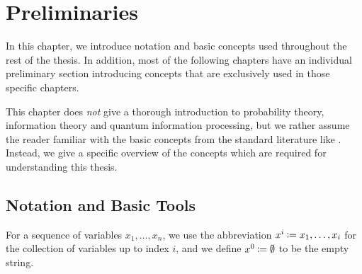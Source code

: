 \documentclass[final,11pt,a4paper]{report}
\newcommand*{\mycitation}[2]{
  {\begin{flushright}
      \emph{#1} \\ 
      \textrm{--- #2}
    \end{flushright}}}
\newcommand*{\clearemptydoublepage}{\newpage{\pagestyle{empty}\cleardoublepage}}
\newcommand*{\assign}{\ensuremath{\kern.5ex\raisebox{.1ex}{\mbox{\rm:}}\kern -.3em =}}
\newcommand*{\prei}[2][i-1]{#2^{#1}} %
\begin{document}
\pagestyle{empty} 
\setcounter{secnumdepth}{-1}






\clearemptydoublepage
{}
{}
\tableofcontents
\clearemptydoublepage
{}
\setcounter{secnumdepth}{2}

\pagestyle{myheadings}
\renewcommand*{\chaptermark}[1]{\markboth{\textsc{\chaptername\
      \thechapter. #1}}{}} 
\renewcommand*{\sectionmark}[1]{\markright{\textsc{\thesection. #1}}}





\clearemptydoublepage
\chapter{Preliminaries}   \label{chap:prelim}
In this chapter, we introduce notation and basic concepts used
throughout the rest of the thesis. In addition, most of the following
chapters have an individual preliminary section introducing concepts
that are exclusively used in those specific chapters.

This chapter does \emph{not} give a thorough introduction to
probability theory, information theory and quantum information
processing, but we rather assume the reader familiar with the basic
concepts from the standard literature like \cite{CT91, NC00}.
Instead, we give a specific overview of the concepts which are
required for understanding this thesis.

\section{Notation and Basic Tools} \label{sec:notation}
For a sequence of variables $x_1,\ldots, x_n$, we use the abbreviation
$\prei[i]{x} \assign x_1,\ldots,x_i$ for the collection of variables
up to index $i$, and we define \mbox{$\prei[0]{x} \assign \emptyset$} to
be the empty string.
\end{document}
